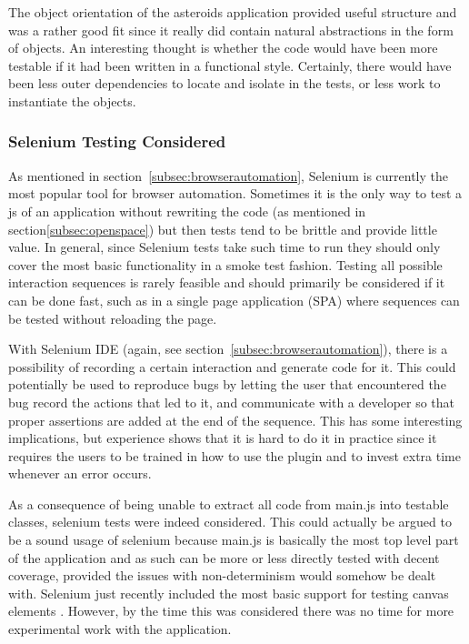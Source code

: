 \documentclass[11pt]{article}
\begin{document}
The object orientation of the asteroids application provided useful structure and was a rather good fit since it really did contain natural abstractions in the form of objects. An interesting thought is whether the code would have been more testable if it had been written in a functional style. Certainly, there would have been less outer dependencies to locate and isolate in the tests, or less work to instantiate the objects. \cite[question~26]{Ahnve}

\subsubsection{Selenium Testing Considered}
\label{subsec:asteroids}

As mentioned in section~\ref{subsec:browserautomation}, Selenium is currently the most popular tool for browser automation. Sometimes it is the only way to test a \gls{js} of an application without rewriting the code\cite[question~43]{Stenmark} (as mentioned in section\ref{subsec:openspace}) but then tests tend to be brittle and provide little value. In general, since Selenium tests take such time to run they should only cover the most basic functionality in a smoke test fashion. \cite[questions~16-17]{Stenmark}\cite[question~21]{Ahnve} Testing all possible interaction sequences is rarely feasible and should primarily be considered if it can be done fast, such as in a single page application (SPA) where sequences can be tested without reloading the page. \cite[question~44]{Edelstam}

With Selenium IDE (again, see section~\ref{subsec:browserautomation}), there is a possibility of recording a certain interaction and generate code for it. This could potentially be used to reproduce bugs by letting the user that encountered the bug record the actions that led to it, and communicate with a developer so that proper assertions are added at the end of the sequence. This has some interesting implications, but experience shows that it is hard to do it in practice since it requires the users to be trained in how to use the plugin and to invest extra time whenever an error occurs. \cite[questions~42-43]{Edelstam}

As a consequence of being unable to extract all code from main.js into testable classes, selenium tests were indeed considered. This could actually be argued to be a sound usage of selenium because main.js is basically the most top level part of the application and as such can be more or less directly tested with decent coverage, provided the issues with non-determinism would somehow be dealt with. Selenium just recently included the most basic support for testing canvas elements \cite[p.~165-166]{Selenium2}. However, by the time this was considered there was no time for more experimental work with the application.
\end{document}
